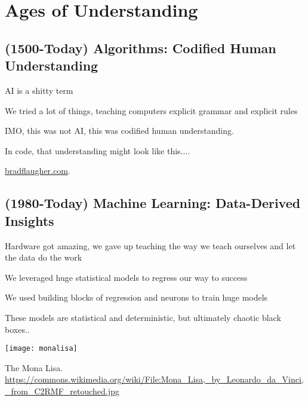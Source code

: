 \setchapterpreamble[u]{\margintoc}
\chapter{Ages of Understanding}

\section{(1500-Today) Algorithms: Codified Human Understanding}

AI is a shitty term

We tried a lot of things, teaching computers explicit grammar and explicit rules

IMO, this was not AI, this was codified human understanding.

In code, that understanding might look like this.... %

\href{https://bradflaugher.com}{bradflaugher.com}.  


\section{(1980-Today) Machine Learning: Data-Derived Insights}

Hardware got amazing, we gave up teaching the way we teach ourselves and let the data do the work

We leveraged huge statistical models to regress our way to success

We used building blocks of regression and neurons to train huge models

These models are statistical and deterministic, but ultimately chaotic black boxes..



\begin{marginfigure}[-5.5cm]
	\texttt{[image: monalisa]}
	\caption[The Mona Lisa]{The Mona Lisa.\\ 
	\url{https://commons.wikimedia.org/wiki/File:Mona_Lisa,_by_Leonardo_da_Vinci,_from_C2RMF_retouched.jpg}}
\end{marginfigure}
